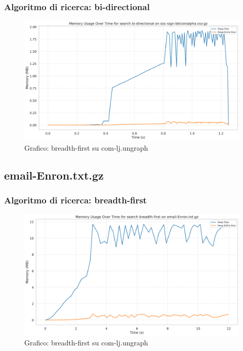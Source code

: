 \documentclass{article}
\begin{document}
\subsubsection{Algoritmo di ricerca: bi-directional}
\begin{figure}[htbp]\centering
\includegraphics[width=\textwidth]{../plots/soc-sign-bitcoinalpha.csv_bi-directional.png}
\caption{Grafico: breadth-first su com-lj.ungraph}
\end{figure}
\subsection{email-Enron.txt.gz}
\subsubsection{Algoritmo di ricerca: breadth-first}
\begin{figure}[htbp]\centering
\includegraphics[width=\textwidth]{../plots/email-Enron_breadth-first.png}
\caption{Grafico: breadth-first su com-lj.ungraph}
\end{figure}
\end{document}
